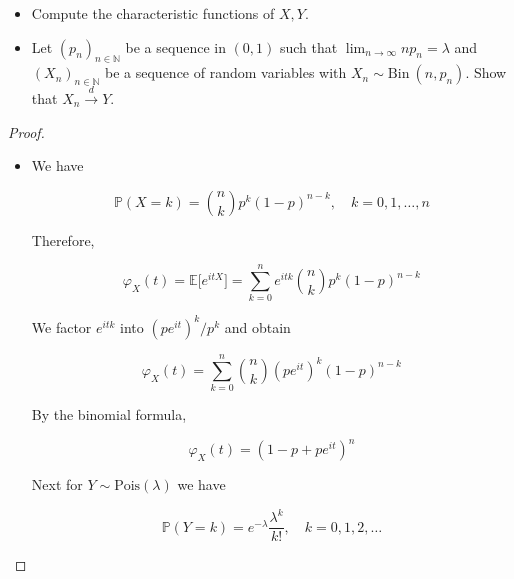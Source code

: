 \begin{itemize}
\item
  Compute the characteristic functions of \(\mathit{X},\mathit{Y}\).
\item
  Let \(\left( \mathit{p}_{\mathit{n}} \right)_{\mathit{n} \in \mathbb{N}}\) be a sequence in \((0,1)\) such that \(\lim_{\mathit{n}\rightarrow\infty}\mathit{n}\mathit{p}_{\mathit{n}} = \mathit{\lambda}\) and \(\left( \mathit{X}_{\mathit{n}} \right)_{\mathit{n} \in \mathbb{N}}\) be a sequence of random variables with \(\mathit{X}_{\mathit{n}} \sim \text{Bin}\ \left( {\mathit{n},\mathit{p}_{\mathit{n}}} \right)\). Show that \(\mathit{X}_{\mathit{n}}\overset{\mathit{d}}{\rightarrow}\mathit{Y}\).
\end{itemize}

\begin{proof}

\begin{itemize}
\item
  We have

  \[\mathbb{P}(\mathit{X} = \mathit{k}) = \binom{\mathit{n}}{\mathit{k}}\mathit{p}^{\mathit{k}}(1 - \mathit{p})^{\mathit{n} - \mathit{k}},\quad\mathit{k} = 0,1,\ldots,\mathit{n}\]

  Therefore,

  \[\mathit{\varphi}_{\mathit{X}}(\mathit{t}) = \mathbb{E}\lbrack\mathit{e}^{\mathit{i}\mathit{t}\mathit{X}}\rbrack = \sum\limits_{\mathit{k} = 0}^{\mathit{n}}\mathit{e}^{\mathit{i}\mathit{t}\mathit{k}}\binom{\mathit{n}}{\mathit{k}}\mathit{p}^{\mathit{k}}(1 - \mathit{p})^{\mathit{n} - \mathit{k}}\]

  We factor \(\mathit{e}^{\mathit{i}\mathit{t}\mathit{k}}\) into \((\mathit{p}\mathit{e}^{\mathit{i}\mathit{t}})^{\mathit{k}}/\mathit{p}^{\mathit{k}}\) and obtain

  \[\mathit{\varphi}_{\mathit{X}}(\mathit{t}) = \sum\limits_{\mathit{k} = 0}^{\mathit{n}}\binom{\mathit{n}}{\mathit{k}}(\mathit{p}\mathit{e}^{\mathit{i}\mathit{t}})^{\mathit{k}}(1 - \mathit{p})^{\mathit{n} - \mathit{k}}\]

  By the binomial formula,

  \[\mathit{\varphi}_{\mathit{X}}(\mathit{t}) = (1 - \mathit{p} + \mathit{p}\mathit{e}^{\mathit{i}\mathit{t}})^{\mathit{n}}\]

  Next for \(\mathit{Y} \sim \text{Pois}(\mathit{\lambda})\) we have

  \[\mathbb{P}(\mathit{Y} = \mathit{k}) = \mathit{e}^{- \mathit{\lambda}}\frac{\mathit{\lambda}^{\mathit{k}}}{\mathit{k}!},\quad\mathit{k} = 0,1,2,\ldots\]


\end{itemize}
\end{proof}
